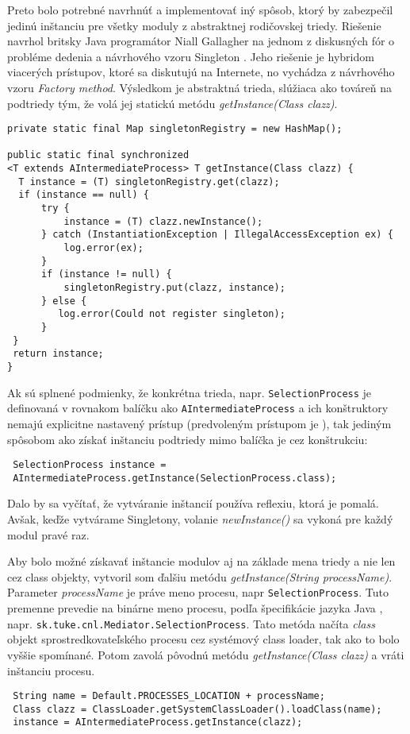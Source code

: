 Preto bolo potrebné navrhnúť a implementovať iný spôsob, ktorý by zabezpečil jedinú inštanciu pre všetky 
moduly z abstraktnej rodičovskej triedy. Riešenie navrhol britsky Java programátor Niall Gallagher
na jednom z diskusných fór o probléme dedenia a návrhového vzoru Singleton \citep{gallagher}.
Jeho riešenie je hybridom viacerých prístupov, ktoré sa diskutujú na Internete, no vychádza z 
návrhového vzoru \emph{Factory method}. Výsledkom je abstraktná trieda, slúžiaca ako továreň na 
podtriedy tým, že volá jej statickú metódu \emph{getInstance(Class clazz)}. 
\begin{verbatim}
private static final Map singletonRegistry = new HashMap();

public static final synchronized 
<T extends AIntermediateProcess> T getInstance(Class clazz) {
  T instance = (T) singletonRegistry.get(clazz);
  if (instance == null) {
      try {
          instance = (T) clazz.newInstance();
      } catch (InstantiationException | IllegalAccessException ex) {
          log.error(ex);
      }
      if (instance != null) {
          singletonRegistry.put(clazz, instance);
      } else {
         log.error(Could not register singleton);
      }
 }
 return instance;
}
\end{verbatim}
Ak sú splnené podmienky, že konkrétna trieda, napr. \verb|SelectionProcess| je definovaná v rovnakom 
balíčku ako \verb|AIntermediateProcess| a ich konštruktory nemajú explicitne nastavený prístup 
(predvoleným prístupom je ), tak 
jediným spôsobom ako získať inštanciu podtriedy mimo balíčka je cez konštrukciu:
\begin{verbatim}
 SelectionProcess instance = 
 AIntermediateProcess.getInstance(SelectionProcess.class);
\end{verbatim}
Dalo by sa vyčítať, že vytváranie inštancií používa reflexiu, ktorá je pomalá. Avšak, keďže vytvárame 
Singletony, volanie \emph{newInstance()} sa vykoná pre každý modul pravé raz.

Aby bolo možné získavať inštancie modulov aj na základe mena triedy a nie len cez class objekty, vytvoril 
som ďalšiu metódu \emph{getInstance(String processName)}. Parameter \emph{processName} je práve meno 
procesu, napr \verb|SelectionProcess|. Tuto premenne prevedie na binárne meno procesu, 
podľa špecifikácie jazyka Java \citep{java_spec},
napr. \verb|sk.tuke.cnl.Mediator.SelectionProcess|.
Tato metóda načíta \emph{class} objekt sprostredkovateľského procesu cez systémový class loader,
tak ako to bolo vyššie spomínané. Potom zavolá pôvodnú metódu \emph{getInstance(Class clazz)} a 
vráti inštanciu procesu.
\begin{verbatim}
 String name = Default.PROCESSES_LOCATION + processName;
 Class clazz = ClassLoader.getSystemClassLoader().loadClass(name);
 instance = AIntermediateProcess.getInstance(clazz);
\end{verbatim}



